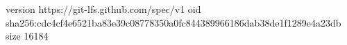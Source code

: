 version https://git-lfs.github.com/spec/v1
oid sha256:cdc4cf4e6521ba83e39c08778350a0fc844389966186dab38de1f1289e4a23db
size 16184
